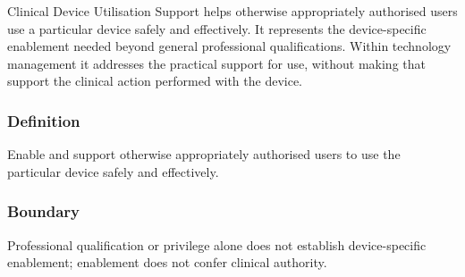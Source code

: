 Clinical Device Utilisation Support helps otherwise appropriately authorised users use a particular device safely and effectively. It represents the device-specific enablement needed beyond general professional qualifications. Within technology management it addresses the practical support for use, without making that support the clinical action performed with the device.

\subsubsection*{Definition}

Enable and support otherwise appropriately authorised users to use the particular device safely and effectively.

\subsubsection*{Boundary}

Professional qualification or privilege alone does not establish device-specific enablement; enablement does not confer clinical authority.

